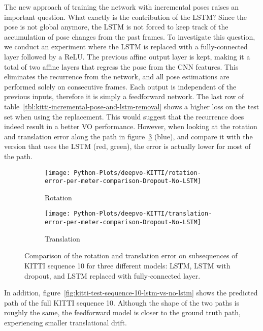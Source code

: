 		The new approach of training the network with incremental poses raises an important question.
		What exactly is the contribution of the LSTM?
		Since the pose is not global anymore, the LSTM is not forced to keep track of the accumulation of pose changes from the past frames.
		To investigate this question, we conduct an experiment where the LSTM is replaced with a fully-connected layer followed by a ReLU.
		The previous affine output layer is kept, making it a total of two affine layers that regress the pose from the CNN features.
		This eliminates the recurrence from the network, and all pose estimations are performed solely on consecutive frames.
		Each output is independent of the previous inputs, therefore it is simply a feedforward network.
		The last row of table~\ref{tbl:kitti-incremental-pose-and-lstm-removal} shows a higher loss on the test set when using the replacement.
		This would suggest that the recurrence does indeed result in a better VO performance.
		However, when looking at the rotation and translation error along the path in figure~\ref{fig:avg-rotation-and-translation-error-dropout-no-LSTM} (blue), and compare it with the version that uses the LSTM (red, green), the error is actually lower for most of the path.
		\begin{figure}
			\centering
			\begin{subfigure}[b]{0.5\linewidth}
				\centering
				\texttt{[image: Python-Plots/deepvo-KITTI/rotation-error-per-meter-comparison-Dropout-No-LSTM]}
				\caption{
					Rotation
					\label{fig:avg-rotation-error-dropout-no-LSTM}
				}
			\end{subfigure}%
			\begin{subfigure}[b]{0.5\linewidth}
				\centering
				\texttt{[image: Python-Plots/deepvo-KITTI/translation-error-per-meter-comparison-Dropout-No-LSTM]}
				\caption{
					Translation
					\label{fig:avg-translation-error-dropout-no-LSTM}
				}
			\end{subfigure}%
			\caption[Comparison: LSTM vs. LSTM with dropout vs. no LSTM]
					{Comparison of the rotation and translation error on subsequences of KITTI sequence 10 for three different models:
					 LSTM, LSTM with dropout, and LSTM replaced with fully-connected layer.
					 \label{fig:avg-rotation-and-translation-error-dropout-no-LSTM}}
		\end{figure}
		In addition, figure~\ref{fig:kitti-test-sequence-10-lstm-vs-no-lstm} shows the predicted path of the full KITTI sequence 10.
		Although the shape of the two paths is roughly the same, the feedforward model is closer to the ground truth path, experiencing smaller translational drift.
